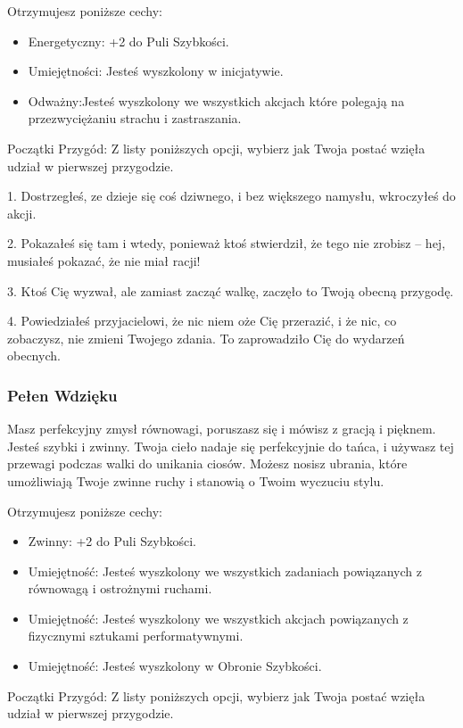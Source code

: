 Otrzymujesz poniższe cechy:
\begin{itemize}
    \item Energetyczny: +2 do Puli Szybkości.
    \item Umiejętności: Jesteś wyszkolony w inicjatywie. 
    \item Odważny:Jesteś wyszkolony we wszystkich akcjach które polegają na przezwyciężaniu strachu i zastraszania. 
\end{itemize}

Początki Przygód: Z listy poniższych opcji, wybierz jak Twoja postać wzięła udział w pierwszej przygodzie.

1. Dostrzegłeś, ze dzieje się coś dziwnego, i bez większego namysłu, wkroczyłeś do akcji.

2. Pokazałeś się tam i wtedy, ponieważ ktoś stwierdził, że tego nie zrobisz – hej, musiałeś pokazać, że nie miał racji!

3. Ktoś Cię wyzwał, ale zamiast zacząć walkę, zaczęło to Twoją obecną przygodę.

4. Powiedziałeś przyjacielowi, że nic niem oże Cię przerazić, i że nic, co zobaczysz, nie zmieni Twojego zdania. To zaprowadziło Cię do wydarzeń obecnych. 

\subsubsection{Pełen Wdzięku}

Masz perfekcyjny zmysł równowagi, poruszasz się i mówisz z gracją i pięknem. Jesteś szybki i zwinny. Twoja cieło nadaje się perfekcyjnie do tańca, i używasz tej przewagi podczas walki do unikania ciosów. Możesz nosisz ubrania, które umożliwiają Twoje zwinne ruchy i stanowią o Twoim wyczuciu stylu.

Otrzymujesz poniższe cechy:
\begin{itemize}
    \item Zwinny: +2 do Puli Szybkości.
    \item Umiejętność: Jesteś wyszkolony we wszystkich zadaniach powiązanych z równowagą i ostrożnymi ruchami.
    \item Umiejętność: Jesteś wyszkolony we wszystkich akcjach powiązanych z fizycznymi sztukami performatywnymi.
    \item Umiejętność: Jesteś wyszkolony w Obronie Szybkości.
\end{itemize}

Początki Przygód: Z listy poniższych opcji, wybierz jak Twoja postać wzięła udział w pierwszej przygodzie.

